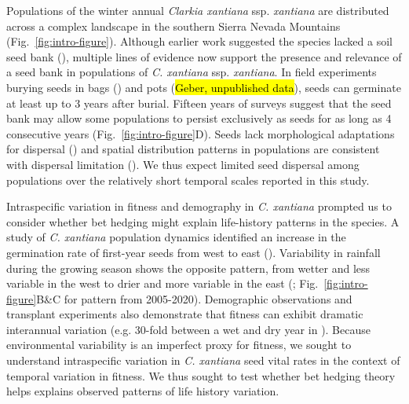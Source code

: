 \documentclass[12pt, oneside]{article}   	%
\begin{document}
Populations of the winter annual \textit{Clarkia xantiana} ssp. \textit{xantiana} are distributed across a complex landscape in the southern Sierra Nevada Mountains (Fig.~\ref{fig:intro-figure}). Although earlier work suggested the species lacked a soil seed bank (\cite{lewis1962}), multiple lines of evidence now support the presence and relevance of a seed bank in populations of \textit{C. xantiana} ssp. \textit{xantiana}. In field experiments burying seeds in bags (\cite{eckhart2011}) and pots (\hl{Geber, unpublished data}), seeds can germinate at least up to 3 years after burial. Fifteen years of surveys suggest that the seed bank may allow some populations to persist exclusively as seeds for as long as 4 consecutive years (Fig.~\ref{fig:intro-figure}D). Seeds lack morphological adaptations for dispersal (\cite{knies2004}) and spatial distribution patterns in populations are consistent with dispersal limitation (\cite{kramer2011}). We thus expect limited seed dispersal among populations over the relatively short temporal scales reported in this study.

Intraspecific variation in fitness and demography in \textit{C. xantiana} prompted us to consider whether bet hedging might explain life-history patterns in the species. A study of \textit{C. xantiana} population dynamics identified an increase in the germination rate of first-year seeds from west to east (\cite{eckhart2011}). Variability in rainfall during the growing season shows the opposite pattern, from wetter and less variable in the west to drier and more variable in the east (\cite{eckhart2011}; Fig.~\ref{fig:intro-figure}B\&C for pattern from 2005-2020). Demographic observations \cite{eckhart2011} and transplant experiments also demonstrate that fitness can exhibit dramatic interannual variation (e.g. 30-fold between a wet and dry year in \cite{geber2005}). Because environmental variability is an imperfect proxy for fitness, we sought to understand intraspecific variation in \textit{C. xantiana} seed vital rates in the context of temporal variation in fitness. We thus sought to test whether bet hedging theory helps explains observed patterns of life history variation.
 
\end{document}
